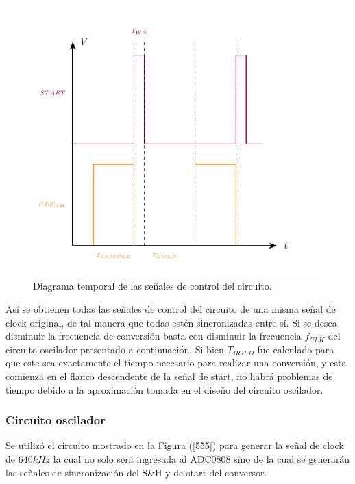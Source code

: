 \begin{figure}[H]
\centering
\includegraphics[width=0.7\linewidth]{ImagenesEjercicio1/Graficos.pdf}
\caption{Diagrama temporal de las señales de control del circuito.}
\label{START}
\end{figure}

Así se obtienen todas las señales de control del circuito de una misma señal de clock original, de tal manera que todas estén sincronizadas entre sí. Si se desea disminuir la frecuencia de conversión basta con disminuir la frecuencia $f_{CLK}$ del circuito oscilador presentado a continuación. Si bien $T_{HOLD}$ fue calculado para que este sea exactamente el tiempo necesario para realizar una conversión, y esta comienza en el flanco descendente de la señal de start, no habrá problemas de tiempo debido a la aproximación tomada en el diseño del circuito oscilador.

\subsubsection{Circuito oscilador}

Se utilizó el circuito mostrado en la Figura (\ref{555}) para generar la señal de clock de $640kHz$ la cual no solo será ingresada al ADC0808 sino de la cual se generarán las señales de sincronización del S\&H y de start del conversor.

